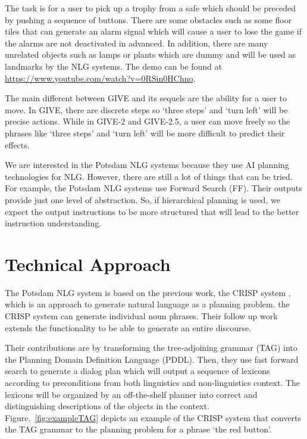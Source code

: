 \documentclass[11pt]{article} %
\begin{document}
The task is for a user to pick up a trophy from a safe which should be preceded
by pushing a sequence of buttons.
There are some obstacles such as some floor tiles that can generate an alarm signal
which will cause a user to lose the game if the alarms are not deactivated in advanced.
In addition, there are many unrelated objects such as lamps or plants which are dummy
and will be used as landmarks by the NLG systems.
The demo can be found at \url{https://www.youtube.com/watch?v=0RSin0HChno}.

The main different between GIVE and its sequels are the ability for a user to move.
In GIVE, there are discrete steps so `three steps' and `turn left' will be precise actions.
While in GIVE-2 and GIVE-2.5, a user can move freely so the phrases like `three steps'
and `turn left' will be more difficult to predict their effects.

We are interested in the Potsdam NLG systems \cite{garoufi2011potsdam} because they use AI planning
technologies for NLG.
However, there are still a lot of things that can be tried.
For example, the Potsdam NLG systems use Forward Search (FF).
Their outputs provide just one level of abstraction.
So, if hierarchical planning is used, we expect the output instructions to be more structured
that will lead to the better instruction understanding.

\section{Technical Approach}


The Potsdam NLG system \cite{garoufi2011combining, garoufi2011potsdam, garoufi2014generation} is based on the previous work, the CRISP system \cite{crisp07}, which is an approach to generate natural language as a planning problem. the CRISP system can generate individual noun phrases. Their follow up work \cite{scrisp-10} extends the functionality to be able to generate an entire discourse.

Their contributions are by transforming the tree-adjoining grammar (TAG) into the Planning Domain Definition Language (PDDL). Then, they use fast forward search \cite{hoffmann:nebel:jair-01} to generate a dialog plan which will output a sequence of lexicons according to preconditions from both linguistics and non-linguistics context. The lexicons will be organized by an off-the-shelf planner into correct and distinguishing descriptions of the objects in the context. Figure.~\ref{fig:exampleTAG} depicts an example of the CRISP system that converts the TAG grammar to the planning problem for a phrase `the red button'.
\end{document}
